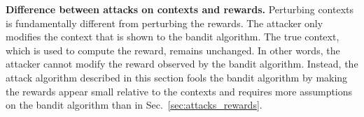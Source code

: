 \textbf{Difference between attacks on contexts and rewards.} Perturbing contexts is fundamentally different from perturbing the rewards. The attacker only modifies the context that is shown to the bandit algorithm. The true context, which is used to compute the reward, remains unchanged. In other words, the attacker cannot modify the reward observed by the bandit algorithm. Instead, the attack algorithm described in this  section fools the bandit algorithm by making the rewards appear small relative to the contexts and requires more assumptions on the bandit algorithm than in Sec.~\ref{sec:attacks_rewards}.

